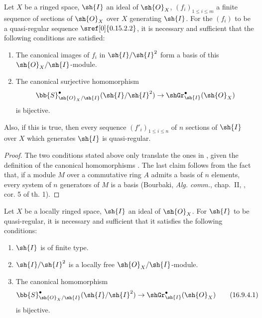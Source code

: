 \begin{proposition}[16.9.3]
\label{IV.16.9.3}
Let $X$ be a ringed space, $\sh{I}$ an ideal of $\sh{O}_X$, $(f_i)_{1 \leq i \leq m}$ a finite sequence of sections of $\sh{O}_X$ over $X$ generating $\sh{I}$.
For the $(f_i)$ to be a quasi-regular sequence $\sref[0]{0.15.2.2}$, it is necessary and sufficient that the following conditions are satisfied:
\begin{enumerate}
  \item[\rm{(i)}] The canonical images of $f_i$ in $\sh{I}/\sh{I}^2$ form a basis of this $\sh{O}_X/\sh{I}$-module.
  \item[\rm{(ii)}] The canonical surjective homomorphism 
  \[
    \bb{S}_{\sh{O}_X/\sh{I}}^\bullet (\sh{I}/\sh{I}^2) \to \shGr_{\sh{I}}^\bullet(\sh{O}_X) 
  \]
  is bijective.
\end{enumerate}

Also, if this is true, then every sequence $(f'_i)_{1 \leq i \leq n}$ of $n$ sections of $\sh{I}$ over $X$ which generates $\sh{I}$ is quasi-regular.
\end{proposition}


\begin{proof}
The two conditions stated above only translate the ones in , given the definition of the canonical homomorphisms .
The last claim follows from the fact that, if a module $M$ over a commutative ring $A$ admits a basis of $n$ elements, every system of $n$ generators of $M$ is a basis (Bourbaki, \emph{Alg. comm.}, chap.~II, , cor. 5 of th. 1).
\end{proof}

\begin{corollary}[16.9.4]
\label{IV.16.9.4}
Let $X$ be a locally ringed space, $\sh{I}$ an ideal of $\sh{O}_X$.
For $\sh{I}$ to be quasi-regular, it is necessary and sufficient that it satisfies the following conditions:
\begin{enumerate}
  \item[\rm{(i)}] $\sh{I}$ is of finite type.
  \item[\rm{(ii)}] $\sh{I}/\sh{I}^2$ is a locally free $\sh{O}_X/\sh{I}$-module.
  \item[\rm{(iii)}] The canonical homomorphism
  \[
    \label{IV.16.9.4.1}
    \bb{S}_{\sh{O}_X/\sh{I}}^\bullet (\sh{I}/\sh{I}^2) \to \shGr_{\sh{I}}^\bullet(\sh{O}_X) 
    \tag{16.9.4.1}
  \]
  is bijective.
\end{enumerate}
\end{corollary}

